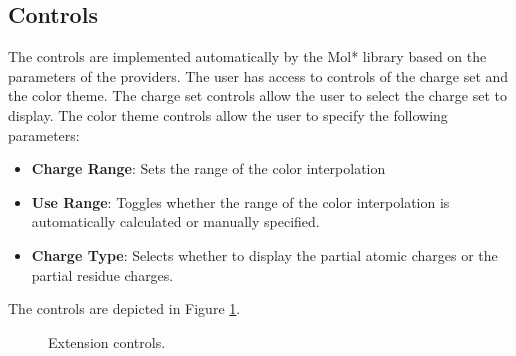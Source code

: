 \documentclass[
  digital,     %
  oneside,     %
  nosansbold,  %
  nocolorbold, %
  lof,         %
  lot,         %
]{fithesis4}
\begin{document}
\subsection{Controls}
\label{subsection:controls}

The controls are implemented automatically by the Mol* library based on the parameters of the providers. The user has access to controls of the charge set and the color theme. The charge set controls allow the user to select the charge set to display. The color theme controls allow the user to specify the following parameters:

\begin{itemize}
  \item \textbf{Charge Range}: Sets the range of the color interpolation
  \item \textbf{Use Range}: Toggles whether the range of the color interpolation is automatically calculated or manually specified.
  \item \textbf{Charge Type}: Selects whether to display the partial atomic charges or the partial residue charges.
\end{itemize}

The controls are depicted in Figure \ref{fig:controls-charge-set}.

\begin{figure}[htbp]
  \centering
  \caption{Extension controls.}
  \label{fig:controls-charge-set}
\end{figure}
\end{document}
